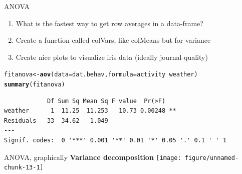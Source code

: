 \documentclass[10pt]{beamer}\usepackage[]{graphicx}\usepackage[]{color}
\makeatletter
\newcommand{\hlopt}[1]{\textcolor[rgb]{0,0,0}{#1}}%
\newcommand{\hlstd}[1]{\textcolor[rgb]{0.345,0.345,0.345}{#1}}%
\newcommand{\hlkwb}[1]{\textcolor[rgb]{0.69,0.353,0.396}{#1}}%
\newcommand{\hlkwc}[1]{\textcolor[rgb]{0.333,0.667,0.333}{#1}}%
\newcommand{\hlkwd}[1]{\textcolor[rgb]{0.737,0.353,0.396}{\textbf{#1}}}%
\newenvironment{kframe}{%
 \def\at@end@of@kframe{}%
 \ifinner\ifhmode%
  \def\at@end@of@kframe{\end{minipage}}%
  \begin{minipage}{\columnwidth}%
 \fi\fi%
 \def\FrameCommand##1{\hskip\@totalleftmargin \hskip-\fboxsep
 \colorbox{shadecolor}{##1}\hskip-\fboxsep
     \hskip-\linewidth \hskip-\@totalleftmargin \hskip\columnwidth}%
 \MakeFramed {\advance\hsize-\width
   \@totalleftmargin\z@ \linewidth\hsize
   \@setminipage}}%
 {\par\unskip\endMakeFramed%
 \at@end@of@kframe}
\newenvironment{knitrout}{}{} %
\makeatother
\begin{document}
\begin{frame}[fragile]{ANOVA}  \begin{enumerate}
    \item What is the fastest way to get row averages in a data-frame?
    \item Create a function called colVars, like colMeans but for variance
    \item Create nice plots to visualize iris data (ideally journal-quality)
  \end{enumerate}


\begin{knitrout}
\color{fgcolor}\begin{kframe}
\begin{alltt}
\hlstd{fitanova} \hlkwb{<-} \hlkwd{aov}\hlstd{(}\hlkwc{data} \hlstd{= dat.behav,} \hlkwc{formula} \hlstd{= activity} \hlopt{~} \hlstd{weather)}
\hlkwd{summary}\hlstd{(fitanova)}
\end{alltt}
\begin{verbatim}
            Df Sum Sq Mean Sq F value  Pr(>F)   
weather      1  11.25  11.253   10.73 0.00248 **
Residuals   33  34.62   1.049                   
---
Signif. codes:  0 '***' 0.001 '**' 0.01 '*' 0.05 '.' 0.1 ' ' 1
\end{verbatim}
\end{kframe}
\end{knitrout}
\end{frame}

\begin{frame}[fragile]{ANOVA, graphically}
\textbf{Variance decomposition}
\centering
\begin{knitrout}
\color{fgcolor}
\texttt{[image: figure/unnamed-chunk-13-1]} 

\end{knitrout}
\end{frame}
\end{document}
